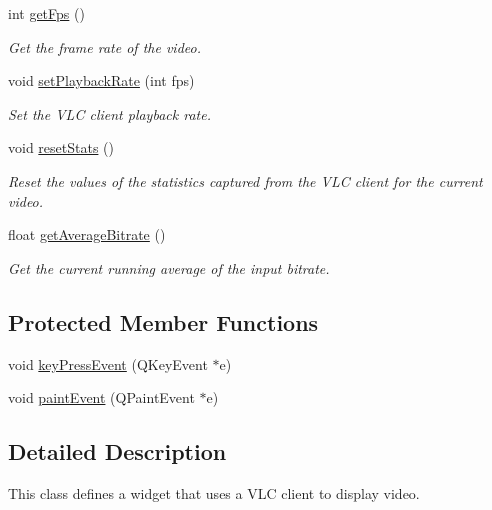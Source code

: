 \begin{DoxyCompactItemize}
int \hyperlink{classVLCVideoWidget_ac80ca2be7b8f96631f32827ab06e70a1}{get\-Fps} ()
\begin{DoxyCompactList}\small\item\em Get the frame rate of the video. \end{DoxyCompactList}\item 
void \hyperlink{classVLCVideoWidget_aff2bdf48d08757e6b86aa5f21eb43fb5}{set\-Playback\-Rate} (int fps)
\begin{DoxyCompactList}\small\item\em Set the V\-L\-C client playback rate. \end{DoxyCompactList}\item 
void \hyperlink{classVLCVideoWidget_af6bfaebcb882449195ea2a5e5918ee57}{reset\-Stats} ()
\begin{DoxyCompactList}\small\item\em Reset the values of the statistics captured from the V\-L\-C client for the current video. \end{DoxyCompactList}\item 
float \hyperlink{classVLCVideoWidget_a61dcea162c69c8e831dc193ccf8271e6}{get\-Average\-Bitrate} ()
\begin{DoxyCompactList}\small\item\em Get the current running average of the input bitrate. \end{DoxyCompactList}\end{DoxyCompactItemize}
\subsection*{Protected Member Functions}
\begin{DoxyCompactItemize}
\item 
void \hyperlink{classVLCVideoWidget_ae6a2d91395f32ad7c80fb1839557da4f}{key\-Press\-Event} (Q\-Key\-Event $\ast$e)
\item 
void \hyperlink{classVLCVideoWidget_a2fb0969c2a4efa024038ce1e1cfe1e64}{paint\-Event} (Q\-Paint\-Event $\ast$e)
\end{DoxyCompactItemize}


\subsection{Detailed Description}
This class defines a widget that uses a V\-L\-C client to display video. 

